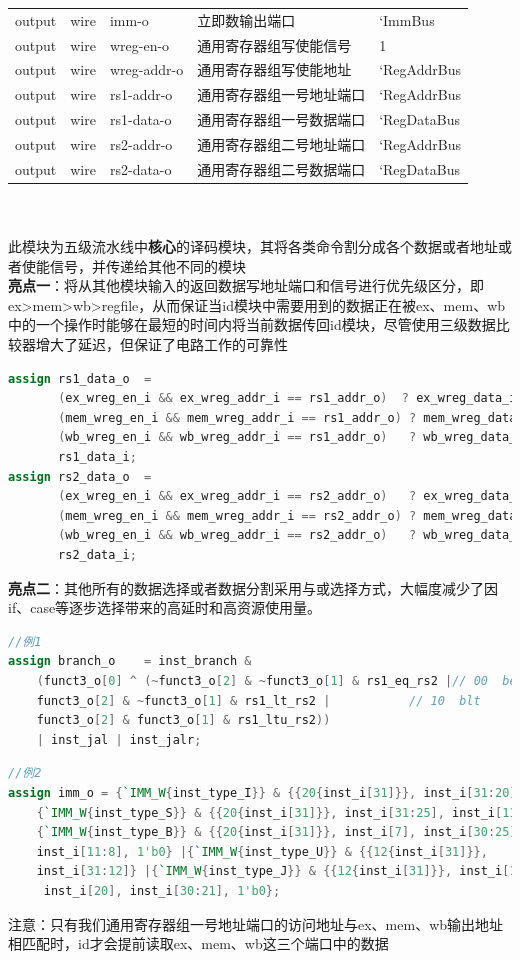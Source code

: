 \documentclass[lang=cn,11pt,a4paper]{elegantpaper}
\begin{document}
\begin{tabular}{cclll}
	output &wire& imm-o & 立即数输出端口    & `ImmBus   \\
	output &wire& wreg-en-o & 通用寄存器组写使能信号    & 1   \\
	output &wire& wreg-addr-o & 通用寄存器组写使能地址    & `RegAddrBus  \\
	output &wire& rs1-addr-o & 通用寄存器组一号地址端口    & `RegAddrBus  \\
	output &wire& rs1-data-o& 通用寄存器组一号数据端口    & `RegDataBus  \\
	output &wire& rs2-addr-o & 通用寄存器组二号地址端口    & `RegAddrBus  \\
	output &wire& rs2-data-o& 通用寄存器组二号数据端口    & `RegDataBus  \\
	\bottomrule
\end{tabular}\\
\\
此模块为五级流水线中\textbf{核心}的译码模块，其将各类命令割分成各个数据或者地址或者使能信号，并传递给其他不同的模块\\
\textbf{亮点一}：将从其他模块输入的返回数据写地址端口和信号进行优先级区分，即ex>mem>wb>regfile，从而保证当id模块中需要用到的数据正在被ex、mem、wb中的一个操作时能够在最短的时间内将当前数据传回id模块，尽管使用三级数据比较器增大了延迟，但保证了电路工作的可靠性\\
\begin{lstlisting}[language=verilog]
assign rs1_data_o  = 
	   (ex_wreg_en_i && ex_wreg_addr_i == rs1_addr_o)  ? ex_wreg_data_i  :
	   (mem_wreg_en_i && mem_wreg_addr_i == rs1_addr_o) ? mem_wreg_data_i :
	   (wb_wreg_en_i && wb_wreg_addr_i == rs1_addr_o)   ? wb_wreg_data_i  :
	   rs1_data_i;
assign rs2_data_o  = 
	   (ex_wreg_en_i && ex_wreg_addr_i == rs2_addr_o)   ? ex_wreg_data_i  :
	   (mem_wreg_en_i && mem_wreg_addr_i == rs2_addr_o) ? mem_wreg_data_i :
	   (wb_wreg_en_i && wb_wreg_addr_i == rs2_addr_o)   ? wb_wreg_data_i  :
	   rs2_data_i;
\end{lstlisting}
\textbf{亮点二}：其他所有的数据选择或者数据分割采用与或选择方式，大幅度减少了因if、case等逐步选择带来的高延时和高资源使用量。
\begin{lstlisting}[language=verilog]
//例1
assign branch_o    = inst_branch & 
	(funct3_o[0] ^ (~funct3_o[2] & ~funct3_o[1] & rs1_eq_rs2 |// 00  beq
	funct3_o[2] & ~funct3_o[1] & rs1_lt_rs2 |           // 10  blt
	funct3_o[2] & funct3_o[1] & rs1_ltu_rs2))
	| inst_jal | inst_jalr;
\end{lstlisting}
\begin{lstlisting}[language=verilog]
//例2
assign imm_o = {`IMM_W{inst_type_I}} & {{20{inst_i[31]}}, inst_i[31:20]} |
	{`IMM_W{inst_type_S}} & {{20{inst_i[31]}}, inst_i[31:25], inst_i[11:7]} |
	{`IMM_W{inst_type_B}} & {{20{inst_i[31]}}, inst_i[7], inst_i[30:25], 
	inst_i[11:8], 1'b0} |{`IMM_W{inst_type_U}} & {{12{inst_i[31]}}, 
	inst_i[31:12]} |{`IMM_W{inst_type_J}} & {{12{inst_i[31]}}, inst_i[19:12],
	 inst_i[20], inst_i[30:21], 1'b0};
\end{lstlisting}
注意：只有我们通用寄存器组一号地址端口的访问地址与ex、mem、wb输出地址相匹配时，id才会提前读取ex、mem、wb这三个端口中的数据
\end{document}
